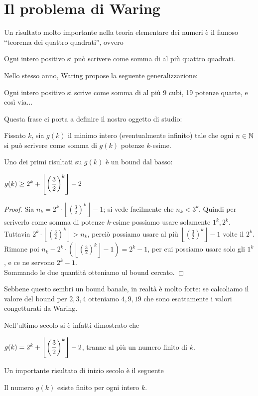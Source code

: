 \section{Il problema di Waring}
Un risultato molto importante nella teoria elementare dei numeri è il famoso ``teorema dei quattro quadrati'', ovvero
\begin{theorem}[Lagrange, 1770]
    Ogni intero positivo si può scrivere come somma di al più quattro quadrati.
\end{theorem}
Nello stesso anno, Waring propose la seguente generalizzazione:
\begin{congettura}[Waring, 1770]
    Ogni intero positivo si scrive come somma di al più 9 cubi, 19 potenze quarte, e così via...
\end{congettura}
Questa frase ci porta a definire il nostro oggetto di studio:
\begin{definition}
    Fissato $k$, sia $g(k)$ il minimo intero (eventualmente infinito) tale che ogni $n\in\mathbb{N}$ si può scrivere come somma di $g(k)$ potenze $k$-esime.
\end{definition}
Uno dei primi risultati su $g(k)$ è un bound dal basso:
\begin{proposition}[Eulero]
    $\displaystyle g(k)\ge2^k+\left\lfloor \left(\frac{3}{2}\right)^k \right\rfloor -2$
\end{proposition}
\begin{proof}
    Sia $n_k=2^k\cdot\left\lfloor \left(\frac{3}{2}\right)^k \right\rfloor-1$; si vede facilmente che $n_k<3^k$. Quindi per scriverlo come somma di potenze $k$-esime possiamo usare solamente $1^k,2^k$.\\
    Tuttavia $2^k\cdot\left\lfloor \left(\frac{3}{2}\right)^k \right\rfloor>n_k$, perciò possiamo usare al più $\left\lfloor \left(\frac{3}{2}\right)^k \right\rfloor-1$ volte il $2^k$.\\
    Rimane poi $n_k-2^k\cdot\left( \left\lfloor \left(\frac{3}{2}\right)^k \right\rfloor -1 \right)=2^k-1$, per cui possiamo usare solo gli $1^k$, e ce ne servono $2^k-1$.\\
    Sommando le due quantità otteniamo ul bound cercato.
\end{proof}
\begin{oss}
    Sebbene questo sembri un bound banale, in realtà è molto forte: se calcoliamo il valore del bound per $2,3,4$ otteniamo $4,9,19$ che sono esattamente i valori congetturati da Waring.
\end{oss}
Nell'ultimo secolo si è infatti dimostrato che
\begin{theorem}[Mahler, 1957]
    $\displaystyle g(k)=2^k+\left\lfloor \left(\frac{3}{2}\right)^k \right\rfloor -2$, tranne al più un numero finito di $k$.
\end{theorem}
Un importante risultato di inizio secolo è il seguente
\begin{theorem}[Hilbert, 1909]
    Il numero $g(k)$ esiste finito per ogni intero $k$.
\end{theorem}

